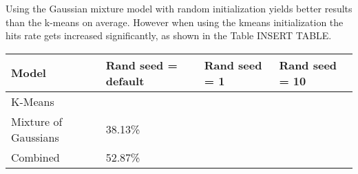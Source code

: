 \documentclass[12pt]{article}
\begin{document}
Using the Gaussian mixture model with random initialization yields better results than the k-means on average. 
However when using the kmeans initialization the hits rate gets increased significantly, as shown in the 
Table INSERT TABLE.

\begin{table}[h]
\begin{tabular}{|l|l|l|l|}
\hline
Model                 & Rand seed = default & Rand seed = 1 & Rand seed = 10 \\ \hline
K-Means               &                     &               &                \\ \hline
Mixture of  Gaussians & 38.13\%             &               &                \\ \hline
Combined              & 52.87\%             &               &                \\ \hline
\end{tabular}
\end{table}
 
\end{document}
